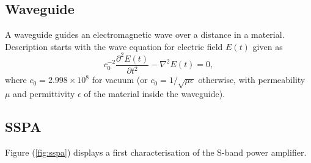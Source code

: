 \documentclass[12pt]{amsart}
\begin{document}
\subsection{Waveguide}

A waveguide guides an electromagnetic wave over a distance in a material.
Description starts with the wave equation for electric field $E(t)$ given as 
\begin{equation}
	c_0^{-2} \dfrac{\partial^2 E(t)}{\partial t^2} - \nabla^2 E(t) = 0,
	\label{eq.wave}
\end{equation}
where $c_0=2.998\times 10^8$ for vacuum (or $c_0 = 1/\sqrt{\mu\epsilon}$ otherwise, 
with permeability $\mu$ and permittivity $\epsilon$ of the material inside the waveguide).




\subsection{SSPA}

Figure (\ref{fig:sspa}) displays a first characterisation of the S-band power amplifier.
\end{document}
